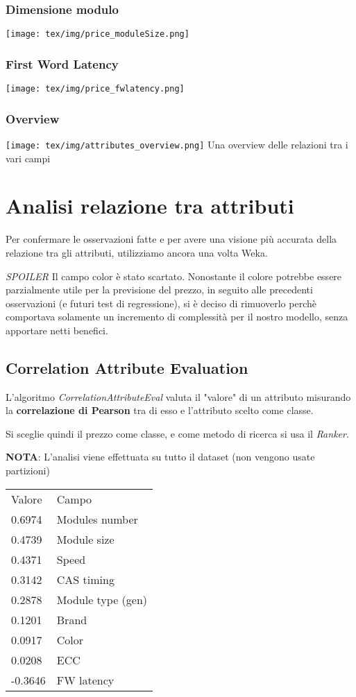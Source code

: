\documentclass[12pt]{report}
\begin{document}
\subsubsection{Dimensione modulo}
\texttt{[image: tex/img/price\_moduleSize.png]}
\subsubsection{First Word Latency}
\texttt{[image: tex/img/price\_fwlatency.png]}
\subsubsection{Overview}
\texttt{[image: tex/img/attributes\_overview.png]}
Una overview delle relazioni tra i vari campi


\newpage
\section{Analisi relazione tra attributi}

Per confermare le osservazioni fatte e per avere una visione più accurata della relazione tra
gli attributi, utilizziamo ancora una volta Weka.

\textit{SPOILER} Il campo color è stato scartato. Nonostante il colore potrebbe essere parzialmente
utile per la previsione del prezzo, in seguito alle precedenti osservazioni (e futuri test di
regressione), si è deciso di rimuoverlo perchè comportava solamente un incremento di complessità per
il nostro modello, senza apportare netti benefici.

\subsection{Correlation Attribute Evaluation}
L'algoritmo \textit{CorrelationAttributeEval} valuta il "valore" di un attributo misurando la
\textbf{correlazione di Pearson} tra di esso e l'attributo scelto come classe.

Si sceglie quindi il prezzo come classe, e come metodo di ricerca si usa il \textit{Ranker}.

\textbf{NOTA}: L'analisi viene effettuata su tutto il dataset (non vengono usate partizioni)
\begin{table}[!htb]
	\centering
	\begin{tabular}{ll}
		Valore  & Campo             \\
		0.6974  & Modules number    \\
		0.4739  & Module size       \\
		0.4371  & Speed             \\
		0.3142  & CAS timing        \\
		0.2878  & Module type (gen) \\
		0.1201  & Brand             \\
		0.0917  & Color             \\
		0.0208  & ECC               \\
		-0.3646 & FW latency       
	\end{tabular}
\end{table}
\end{document}
